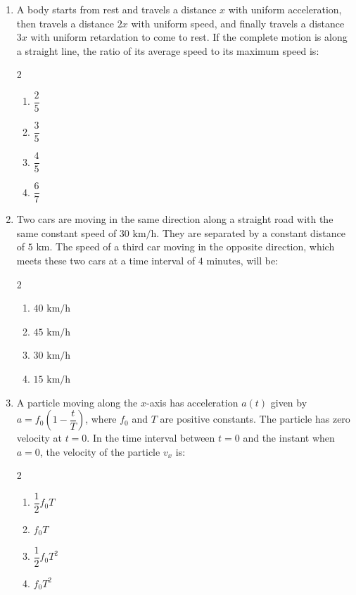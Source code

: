 \documentclass[11pt,a4paper]{article}
\begin{document}
\begin{enumerate}[label=\textbf{\textcolor{l3Crimson}{Q\arabic*.}},leftmargin=24pt,itemsep=10pt,start=51]

  \item A body starts from rest and travels a distance $x$ with uniform acceleration, then travels a distance $2x$ with uniform speed, and finally travels a distance $3x$ with uniform retardation to come to rest. If the complete motion is along a straight line, the ratio of its average speed to its maximum speed is:
  \begin{multicols}{2}
  \begin{enumerate}[label=\textbf{\textcolor{primaryDark}{(\Alph*)}},itemsep=2pt]
    \item $\dfrac{2}{5}$
    \item $\dfrac{3}{5}$
    \item $\dfrac{4}{5}$
    \item $\dfrac{6}{7}$
  \end{enumerate}
  \end{multicols}

  \item Two cars are moving in the same direction along a straight road with the same constant speed of $30\text{ km/h}$. They are separated by a constant distance of $5\text{ km}$. The speed of a third car moving in the opposite direction, which meets these two cars at a time interval of $4\text{ minutes}$, will be:
  \begin{multicols}{2}
  \begin{enumerate}[label=\textbf{\textcolor{primaryDark}{(\Alph*)}},itemsep=2pt]
    \item $40\text{ km/h}$
    \item $45\text{ km/h}$
    \item $30\text{ km/h}$
    \item $15\text{ km/h}$
  \end{enumerate}
  \end{multicols}

  \item A particle moving along the $x$-axis has acceleration $a(t)$ given by $a = f_0\left(1 - \dfrac{t}{T}\right)$, where $f_0$ and $T$ are positive constants. The particle has zero velocity at $t = 0$. In the time interval between $t = 0$ and the instant when $a = 0$, the velocity of the particle $v_x$ is:
  \begin{multicols}{2}
  \begin{enumerate}[label=\textbf{\textcolor{primaryDark}{(\Alph*)}},itemsep=2pt]
    \item $\dfrac{1}{2} f_0 T$
    \item $f_0 T$
    \item $\dfrac{1}{2} f_0 T^2$
    \item $f_0 T^2$
  \end{enumerate}
  \end{multicols}


\end{enumerate}
\end{document}

